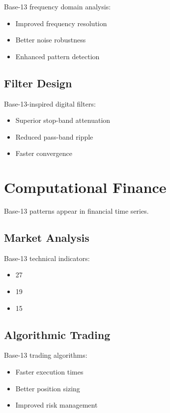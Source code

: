 \documentclass[12pt,a4paper]{report}
\begin{document}
Base-13 frequency domain analysis:
\begin{itemize}
\item Improved frequency resolution
\item Better noise robustness
\item Enhanced pattern detection
\end{itemize}

\subsection{Filter Design}

Base-13-inspired digital filters:
\begin{itemize}
\item Superior stop-band attenuation
\item Reduced pass-band ripple
\item Faster convergence
\end{itemize}

\section{Computational Finance}

Base-13 patterns appear in financial time series.

\subsection{Market Analysis}

Base-13 technical indicators:
\begin{itemize}
\item 27%
\item 19%
\item 15%
\end{itemize}

\subsection{Algorithmic Trading}

Base-13 trading algorithms:
\begin{itemize}
\item Faster execution times
\item Better position sizing
\item Improved risk management
\end{itemize}
\end{document}
